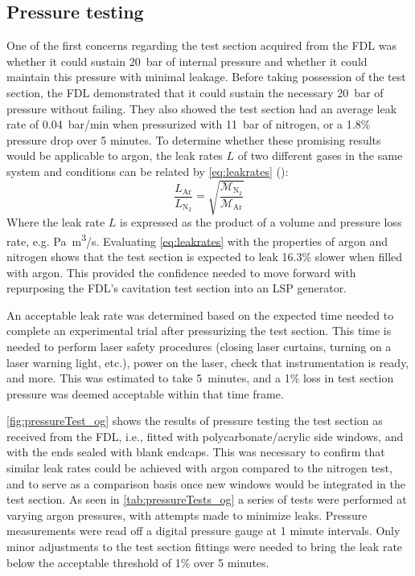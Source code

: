         \subsection{Pressure testing}
            One of the first concerns regarding the test section acquired from the FDL was whether it could sustain 20~bar of internal pressure and whether it could maintain this pressure with minimal leakage. Before taking possession of the test section, the FDL demonstrated that it could sustain the necessary \qty{20}{bar} of pressure without failing. They also showed the test section had an average leak rate of \qty{0.04}{bar/min} when pressurized with \qty{11}{bar} of  nitrogen, or a 1.8\% pressure drop over 5 minutes. To determine whether these promising results would be applicable to argon, the leak rates $L$ of two different gases in the same system and conditions can be related by \autoref{eq:leakrates} (\textcite{greenhouseHermeticityElectronicPackages2012}):
            \begin{equation}
                \frac{L_\mathrm{Ar}}{L_{\mathrm{N}_2}} = \sqrt{\frac{\mathcal{M}_{\mathrm{N}_2}}{\mathcal{M}_\mathrm{Ar}}}
                \label{eq:leakrates}
            \end{equation}
            Where the leak rate $L$ is expressed as the product of a volume and pressure loss rate, e.g. \unit{Pa.m^3/s}. Evaluating \autoref{eq:leakrates} with the properties of argon and  nitrogen shows that the test section is expected to leak 16.3\% slower when filled with argon. This provided the confidence needed to move forward with repurposing the FDL's cavitation test section into an LSP generator.
            
            An acceptable leak rate was determined based on the expected time needed to complete an experimental trial after pressurizing the test section. This time is needed to perform laser safety procedures (closing laser curtains, turning on a laser warning light, etc.), power on the laser, check that instrumentation is ready, and more. This was estimated to take 5~minutes, and a 1\% loss in test section pressure was deemed acceptable within that time frame.

            \autoref{fig:pressureTest_og} shows the results of pressure testing the test section as received from the FDL, i.e., fitted with polycarbonate/acrylic side windows, and with the ends sealed with blank endcaps. This was necessary to confirm that similar leak rates could be achieved with argon compared to the nitrogen test, and to serve as a comparison basis once new windows would be integrated in the test section. As seen in \autoref{tab:pressureTests_og} a series of tests were performed at varying argon pressures, with attempts made to minimize leaks. Pressure measurements were read off a digital pressure gauge at 1 minute intervals. Only minor adjustments to the test section fittings were needed to bring the leak rate below the acceptable threshold of 1\% over 5 minutes. 

